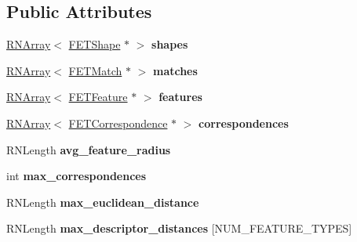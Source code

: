 \subsection*{Public Attributes}
\begin{DoxyCompactItemize}
\item 
\hyperlink{class_r_n_array}{R\+N\+Array}$<$ \hyperlink{struct_f_e_t_shape}{F\+E\+T\+Shape} $\ast$ $>$ {\bfseries shapes}\hypertarget{struct_f_e_t_reconstruction_ac79db3dca56363a957b71ddf1e384167}{}\label{struct_f_e_t_reconstruction_ac79db3dca56363a957b71ddf1e384167}

\item 
\hyperlink{class_r_n_array}{R\+N\+Array}$<$ \hyperlink{struct_f_e_t_match}{F\+E\+T\+Match} $\ast$ $>$ {\bfseries matches}\hypertarget{struct_f_e_t_reconstruction_ad31b19983e59cd917ba9918b01406055}{}\label{struct_f_e_t_reconstruction_ad31b19983e59cd917ba9918b01406055}

\item 
\hyperlink{class_r_n_array}{R\+N\+Array}$<$ \hyperlink{struct_f_e_t_feature}{F\+E\+T\+Feature} $\ast$ $>$ {\bfseries features}\hypertarget{struct_f_e_t_reconstruction_ab473e2b3a56e7e7fa311c9994982eedb}{}\label{struct_f_e_t_reconstruction_ab473e2b3a56e7e7fa311c9994982eedb}

\item 
\hyperlink{class_r_n_array}{R\+N\+Array}$<$ \hyperlink{struct_f_e_t_correspondence}{F\+E\+T\+Correspondence} $\ast$ $>$ {\bfseries correspondences}\hypertarget{struct_f_e_t_reconstruction_a013c4dadf67ab826d8bfc170a9479666}{}\label{struct_f_e_t_reconstruction_a013c4dadf67ab826d8bfc170a9479666}

\item 
R\+N\+Length {\bfseries avg\+\_\+feature\+\_\+radius}\hypertarget{struct_f_e_t_reconstruction_a12ecb54140b9ad3e347dd875e4940bb6}{}\label{struct_f_e_t_reconstruction_a12ecb54140b9ad3e347dd875e4940bb6}

\item 
int {\bfseries max\+\_\+correspondences}\hypertarget{struct_f_e_t_reconstruction_ab40eb228a3236f6fec43e432ab927d28}{}\label{struct_f_e_t_reconstruction_ab40eb228a3236f6fec43e432ab927d28}

\item 
R\+N\+Length {\bfseries max\+\_\+euclidean\+\_\+distance}\hypertarget{struct_f_e_t_reconstruction_aa8649b4ed7ed2f4a5179556fa558734d}{}\label{struct_f_e_t_reconstruction_aa8649b4ed7ed2f4a5179556fa558734d}

\item 
R\+N\+Length {\bfseries max\+\_\+descriptor\+\_\+distances} \mbox{[}N\+U\+M\+\_\+\+F\+E\+A\+T\+U\+R\+E\+\_\+\+T\+Y\+P\+ES\mbox{]}\hypertarget{struct_f_e_t_reconstruction_acb1a95b2194382b2c10f02cf4df10e37}{}\label{struct_f_e_t_reconstruction_acb1a95b2194382b2c10f02cf4df10e37}


\end{DoxyCompactItemize}
